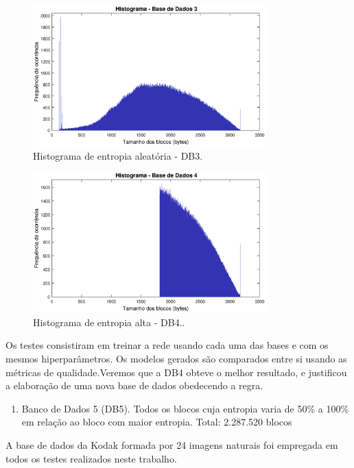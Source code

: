 \begin{figure}
\centering
\includegraphics[width=0.80\textwidth]{figuras/hist3.eps}
\caption[Histograma da entropia aleatória - DB3.]{Histograma de entropia aleatória - DB3.}
\label{fig:database3}
\end{figure}

\begin{figure}
\centering
\includegraphics[width=0.8\textwidth]{figuras/hist4.eps}
\caption[Histograma de entropia alta - DB4.]{Histograma de entropia alta - DB4..}
\label{fig:database4}
\end{figure}

Os testes consistiram em treinar a rede usando cada uma das bases e com os mesmos hiperparâmetros. Os modelos gerados são comparados entre si usando as métricas de qualidade.Veremos que a DB4 obteve o melhor resultado, e justificou a elaboração de uma nova base de dados obedecendo a regra.

\begin {enumerate}
\item Banco de Dados 5 (DB5). Todos os blocos cuja entropia varia de 50\% a 100\% em relação ao bloco com maior entropia. Total: 2.287.520 blocos
\end{enumerate}

A base de dados da Kodak \cite{kodak} formada por 24 imagens naturais foi empregada em todos os testes realizados neste trabalho.  

